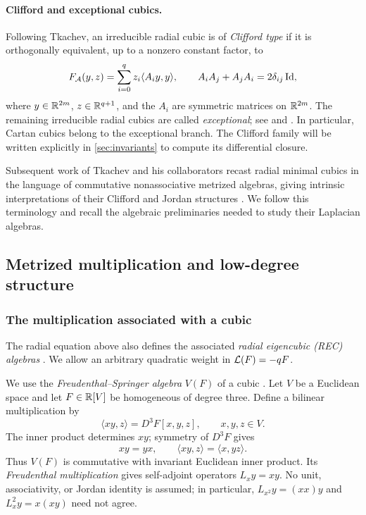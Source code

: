 \paragraph{Clifford and exceptional cubics.}
Following Tkachev, an irreducible radial cubic is of \emph{Clifford
type} if it is orthogonally equivalent, up to a nonzero constant factor,
to
\[
 F_{\mathcal A}(y,z)=\sum_{i=0}^{q}z_i\langle A_i y,y\rangle,
 \qquad A_iA_j+A_jA_i=2\delta_{ij}\operatorname{Id},
\]
where $y\in\mathbb R^{2m}$, $z\in\mathbb R^{q+1}$, and the $A_i$ are symmetric
matrices on $\mathbb R^{2m}$. The remaining irreducible
radial cubics are called \emph{exceptional}; see
\cite[Section~1.2]{TkachevClassification10} and
\cite[Definitions~2.2 and~2.8]{FoxTkachev24}.
In particular, Cartan cubics belong to the exceptional branch.
The Clifford family will be written explicitly in
\cref{sec:invariants} to compute its differential closure.



Subsequent work of Tkachev and his collaborators recast radial minimal
cubics in the language of commutative nonassociative metrized algebras,
giving intrinsic interpretations of their Clifford and Jordan
structures \cite{TkachevJordan14,NadirashviliTkachevVladut14,FoxTkachev24}.
We follow this terminology and recall the algebraic preliminaries
needed to study their Laplacian algebras.

\subsection{Metrized multiplication and low-degree structure}
\subsubsection{The multiplication associated with a cubic}
\label{subsec:cubic-multiplication}

The radial equation above also defines the associated
\emph{radial eigencubic (REC) algebras}
\cite[Definition~6.4.1]{NadirashviliTkachevVladut14}.
We allow an arbitrary quadratic weight in \(\mathcal L(F)=-qF\).

We use the \emph{Freudenthal--Springer algebra} \(V(F)\) of a cubic
\cite[Definition~6.3.1 and equations~(6.4.1)--(6.4.4)]{NadirashviliTkachevVladut14}.
Let \(V\) be a Euclidean space and let \(F\in\mathbb R[V]\) be homogeneous
of degree three. Define a bilinear multiplication by
\begin{equation}\label{eq:cubic-polarized-product}
 \langle xy,z\rangle=D^3F[x,y,z],\qquad x,y,z\in V.
\end{equation}
The inner product determines \(xy\); symmetry of \(D^3F\) gives
\[
 xy=yx,\qquad \langle xy,z\rangle=\langle x,yz\rangle.
\]
Thus \(V(F)\) is commutative with invariant Euclidean inner product.
Its \emph{Freudenthal multiplication} gives self-adjoint operators
\(L_xy=xy\). No unit, associativity, or Jordan identity is assumed;
in particular, \(L_{x^2}y=(xx)y\) and \(L_x^2y=x(xy)\) need not agree.

